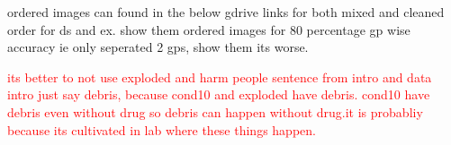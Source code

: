 ordered images can found in the below gdrive links for both mixed and cleaned order for ds and ex.
show them ordered images for 80 percentage gp wise accuracy ie only seperated 2 gps, show them its worse.

\textcolor{red}{its better to not use exploded and harm people sentence from intro and data intro just say debris, because cond10 and exploded have debris. cond10 
have debris even without drug so debris can happen without drug.it is probabliy because its cultivated in lab where these things happen.} 
